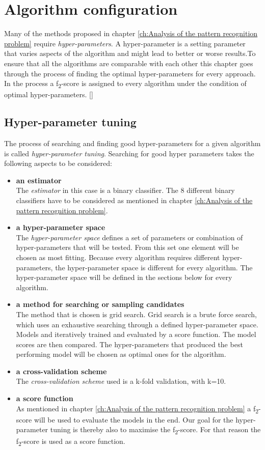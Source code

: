\chapter{Algorithm configuration}
\label{ch:Algorithm configuration}
Many of the methods proposed in chapter \ref{ch:Analysis of the pattern recognition problem} require \emph{hyper-parameters}.  A hyper-parameter is a setting parameter that varies aspects of the algorithm and might lead to better or worse results.To ensure that all the algorithms are comparable with each other this chapter goes through the process of finding the optimal hyper-parameters for every approach. In the process a f\textsubscript{2}-score is assigned to every algorithm under the condition of optimal hyper-parameters.
[]
\section*{Hyper-parameter tuning}
The process of searching and finding good hyper-parameters for a given algorithm is called \emph{hyper-parameter tuning}. Searching for good hyper parameters takes the following aspects to be considered:
\begin{itemize}
\item{ \textbf{an estimator}} \\
The  \emph{estimator} in this case is a binary classifier. The 8 different binary classifiers have to be considered as mentioned in chapter \ref{ch:Analysis of the pattern recognition problem}.
\item{\textbf{a hyper-parameter space}} \\
The \emph{hyper-parameter space} defines a set of parameters or combination of hyper-parameters that will be tested. From this set one element will be chosen as most fitting. Because every algorithm requires different hyper-parameters, the hyper-parameter space is different for every algorithm. The hyper-parameter space will be defined in the sections below for every algorithm. 
\item{\textbf{a method for searching or sampling candidates}}\\
The method that is chosen is grid search. Grid search is a brute force search, which uses an exhaustive searching through a defined hyper-parameter space. Models and iteratively trained and evaluated by a score function. The model scores are then compared. The hyper-parameters that produced the best performing model will be chosen as optimal ones for the algorithm. \cite{gridsearch}
\item{\textbf{a cross-validation scheme}} \\
The  \emph{cross-validation scheme} used is a k-fold validation, with k=10.
\item{\textbf{a score function}}\\
As mentioned in chapter \ref{ch:Analysis of the pattern recognition problem}  a  f\textsubscript{2}-score will be used to evaluate the models in the end. Our goal for the hyper-parameter tuning is thereby also to maximise the  f\textsubscript{2}-score. For that reason the  f\textsubscript{2}-score is used as a score function.
\end{itemize}

